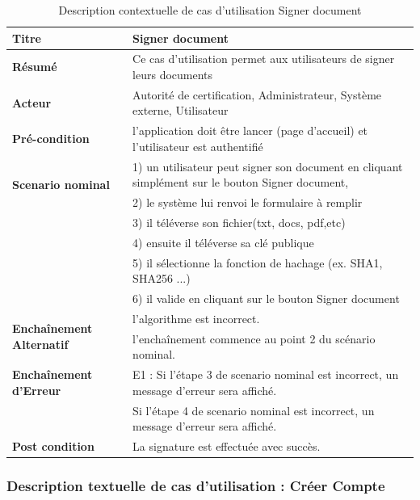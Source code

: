 \documentclass[12pt,a4paper]{article}
\begin{document}
				\begin{table}[H]
			
				\centering
					\caption{Description contextuelle de cas d'utilisation Signer document}
				\begin{tabular}{|l|p{11cm}|}
					\hline 
						\textbf{Titre} & Signer document \\ 
					\hline 
						\textbf{Résumé} & Ce cas d'utilisation permet aux utilisateurs de signer leurs documents \\ 
					\hline 
						\textbf{Acteur} & Autorité de certification, Administrateur, Système externe, Utilisateur \\ 
					\hline 
						\textbf{Pré-condition} & l'application doit être lancer (page d'accueil) et l'utilisateur est authentifié \\ 
					\hline 
						\multirow{2}{*}{\textbf{Scenario nominal}} & 1) un utilisateur peut signer son document en cliquant simplément sur le bouton Signer document, \\
							 & 2) le système lui renvoi le formulaire à remplir \\
							 & 3) il téléverse son fichier(txt, docs, pdf,etc) \\
							 & 4) ensuite il téléverse sa clé publique\\
							 & 5) il sélectionne la fonction de hachage (ex. SHA1, SHA256 ...)\\
							 & 6) il valide en cliquant sur le bouton Signer document \\
					\hline 
					
						\multirow{2}{*}{\textbf{Enchaînement Alternatif}} & l'algorithme est incorrect. \\
							  & l'enchaînement commence au point 2 du scénario nominal. \\
							
					\hline 
						\textbf{Enchaînement d'Erreur} & E1 : Si l'étape 3 de scenario nominal est incorrect, un message d'erreur sera affiché. \\
						& Si l'étape 4 de scenario nominal est incorrect, un message d'erreur sera affiché. \\
					\hline
						\textbf{Post condition} & La signature est effectuée avec succès.\\
					\hline
			\end{tabular} 
		\end{table}
	
	\subsubsection{Description textuelle de cas d'utilisation : Créer Compte}
\end{document}

